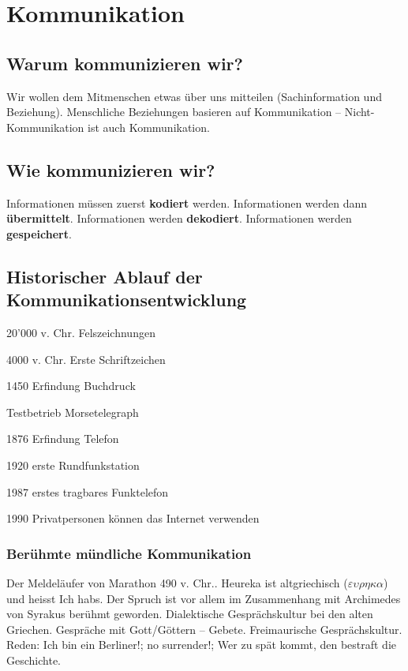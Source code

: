 \documentclass[10pt, openright=true]{scrartcl}
\begin{document}
\section{Kommunikation}
\subsection{Warum kommunizieren wir?}
Wir wollen dem Mitmenschen etwas über uns mitteilen (Sachinformation und Beziehung). Menschliche Beziehungen basieren auf Kommunikation – Nicht-Kommunikation ist auch Kommunikation.
\subsection{Wie kommunizieren wir?}
Informationen müssen zuerst \textbf{kodiert} werden. Informationen werden dann \textbf{übermittelt}. Informationen werden \textbf{dekodiert}. Informationen werden \textbf{gespeichert}.
\subsection{Historischer Ablauf der Kommunikationsentwicklung}
\begin{citemize}
\item 20’000 v. Chr. Felszeichnungen
\item 4000 v. Chr. Erste Schriftzeichen
\item 1450 Erfindung Buchdruck
\item Testbetrieb Morsetelegraph
\item 1876 Erfindung Telefon
\item 1920 erste Rundfunkstation
\item 1987 erstes tragbares Funktelefon
\item 1990 Privatpersonen können das Internet verwenden
\end{citemize}
\subsubsection{Berühmte mündliche Kommunikation}
Der Meldeläufer von Marathon 490 v. Chr.. Heureka ist altgriechisch ($\varepsilon\upsilon\rho\eta\kappa\alpha$) und heisst \glqq Ich habs\grqq . Der Spruch ist vor allem im Zusammenhang mit Archimedes von Syrakus berühmt geworden. Dialektische Gesprächskultur bei den alten Griechen. Gespräche mit Gott/Göttern – Gebete. Freimaurische Gesprächskultur. Reden: \glqq Ich bin ein Berliner!\grqq; \glqq no surrender!\grqq ; \glqq Wer zu spät kommt, den bestraft die Geschichte\grqq .
\end{document}
